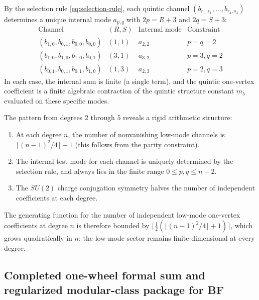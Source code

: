 \begin{computation}
By the selection rule \eqref{eq:selection-rule}, each quintic channel
$(b_{r_1,s_1}, \ldots, b_{r_4,s_4})$ determines a unique internal mode
$a_{p,q}$ with $2p = R + 3$ and $2q = S + 3$:
\[
\renewcommand{\arraystretch}{1.3}
\begin{array}{c|c|c|c}
\text{Channel} & (R,S) & \text{Internal mode} & \text{Constraint} \\
\hline
(b_{1,0}, b_{0,1}, b_{0,0}, b_{0,0}) & (1,1) & a_{2,2} & p=q=2 \\
(b_{1,0}, b_{1,0}, b_{1,0}, b_{0,1}) & (3,1) & a_{3,2} & p=3, q=2 \\
(b_{0,1}, b_{0,1}, b_{0,1}, b_{1,0}) & (1,3) & a_{2,3} & p=2, q=3
\end{array}
\]
In each case, the internal sum is finite (a single term), and the quintic one-vertex
coefficient is a finite algebraic contraction of the quintic structure constant $m_5$
evaluated on these specific modes.
\end{computation}

\begin{remark}
The pattern from degrees $2$ through $5$ reveals a rigid arithmetic structure:
\begin{enumerate}[label=\textup{(\arabic*)}]
\item At each degree $n$, the number of nonvanishing low-mode channels is
 $\lfloor (n-1)^2/4 \rfloor + 1$ (this follows from the parity constraint).
\item The internal test mode for each channel is uniquely determined by the selection
 rule, and always lies in the finite range $0 \leq p,q \leq n-2$.
\item The $SU(2)$ charge conjugation symmetry halves the number of independent
 coefficients at each degree.
\end{enumerate}
The generating function for the number of independent low-mode one-vertex coefficients
at degree $n$ is therefore bounded by
$\lceil \frac{1}{2}(\lfloor (n-1)^2/4 \rfloor + 1) \rceil$, which grows quadratically
in $n$: the low-mode sector remains finite-dimensional at every degree.
\end{remark}

\subsection{Completed one-wheel formal sum and regularized modular-class package for BF}

